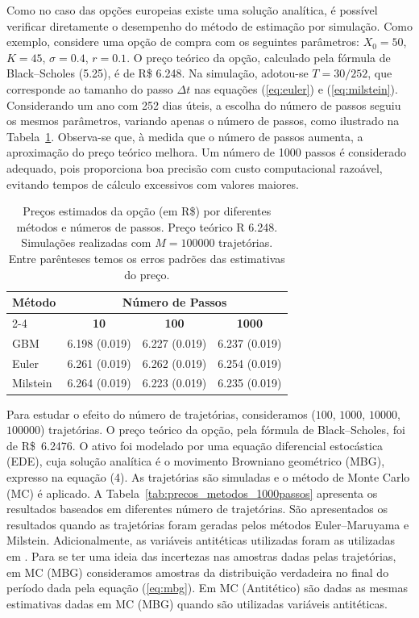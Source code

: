 \documentclass[12pt,openright,oneside,a4paper]{abntex2}
\numberwithin{equation}{section}
\begin{document}
Como no caso das opções europeias existe uma solução analítica, é possível verificar diretamente o desempenho do método de estimação por simulação. Como exemplo, considere uma opção de compra com os seguintes parâmetros: $X_0 = 50$, $K = 45$, $\sigma = 0.4$, $r = 0.1$. O preço teórico da opção, calculado pela fórmula de Black–Scholes (5.25), é de R\$ 6.248.  
Na simulação, adotou-se $T = 30/252$, que corresponde ao tamanho do passo $\Delta t$ nas equações (\ref{eq:euler}) e (\ref{eq:milstein}). Considerando um ano com 252 dias úteis, a escolha do número de passos seguiu os mesmos parâmetros, variando apenas o número de passos, como ilustrado na Tabela~\ref{tab:precos_metodos_passos}. Observa-se que, à medida que o número de passos aumenta, a aproximação do preço teórico melhora. Um número de 1000 passos é considerado adequado, pois proporciona boa precisão com custo computacional razoável, evitando tempos de cálculo excessivos com valores maiores.

\begin{table}[H]
\centering
\scriptsize
\caption{
Preços estimados da opção (em R\$) por diferentes métodos e números de passos. Preço teórico R 6.248. Simulações realizadas com \(M = 100000\) trajetórias. Entre parênteses temos os erros padrões das estimativas do preço.
}
\vspace{0.5em}
\begin{tabular}{|l|c|c|c|}
\hline
\textbf{Método} & \multicolumn{3}{c|}{\textbf{Número de Passos}} \\
\cline{2-4}
                & \textbf{10} & \textbf{100} & \textbf{1000} \\
\hline
GBM        & 6{.}198  (0{.}019) & 6{.}227 (0{.}019) & 6{.}237 (0{.}019) \\
Euler      & 6{.}261  (0{.}019) & 6{.}262 (0{.}019) & 6{.}254 (0{.}019) \\
Milstein   & 6{.}264  (0{.}019) & 6{.}223 (0{.}019) & 6{.}235 (0{.}019) \\
\hline
\end{tabular}
\label{tab:precos_metodos_passos}
\end{table}



Para estudar o efeito do número de trajetórias, consideramos (\( 100 \), \( 1000 \), \( 10000 \), \( 100000 \)) trajetórias. O preço teórico da opção, pela fórmula de Black–Scholes, foi de R\$~6{.}2476. O ativo foi modelado por uma equação diferencial estocástica (EDE), cuja solução analítica é o movimento Browniano geométrico (MBG), expresso na equação (4). As trajetórias são simuladas e o método de Monte Carlo (MC) é aplicado. A Tabela~\ref{tab:precos_metodos_1000passos} apresenta os resultados baseados em diferentes número de trajetórias. São apresentados os resultados quando as  trajetórias foram geradas pelos métodos  Euler–Maruyama e Milstein. Adicionalmente, as variáveis antitéticas utilizadas foram as utilizadas em \textcite[seção 2.2.1]{silva2012}. Para se ter uma ideia das incertezas nas amostras dadas pelas trajetórias, em MC (MBG) consideramos amostras da distribuição verdadeira no final do período dada pela equação (\ref{eq:mbg}). Em MC (Antitético) são dadas as mesmas estimativas dadas em MC (MBG) quando são utilizadas variáveis antitéticas.
\end{document}
